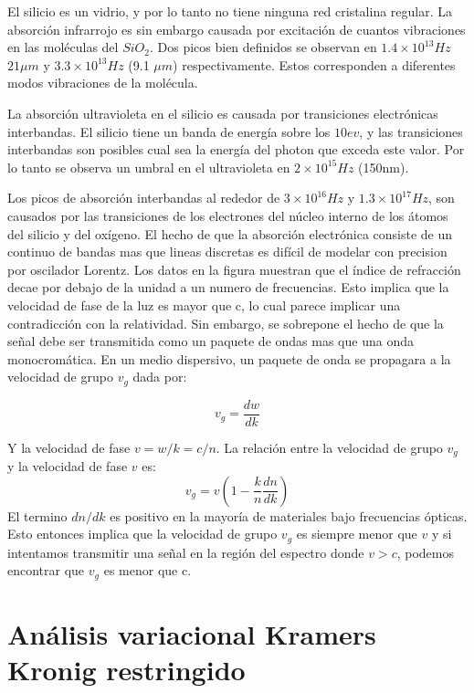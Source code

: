 \documentclass[a4paper,openright,12pt]{book}
\begin{document}
El silicio es un vidrio, y por lo tanto no tiene ninguna red cristalina regular. La absorción infrarrojo es sin embargo causada por excitación de cuantos vibraciones en las moléculas del $SiO_{2}$. Dos picos bien definidos se observan en $1.4\times 10^{13}Hz$ $21\mu m$ y $3.3\times 10^{13}Hz$ (9.1 $\mu m$) respectivamente. Estos corresponden a diferentes modos vibraciones de la molécula. 

La absorción ultravioleta en el silicio es causada por transiciones electrónicas interbandas. El silicio tiene un banda de energía sobre los $10ev$, y las transiciones interbandas son posibles cual sea la energía del photon que exceda este valor. Por lo tanto se observa un umbral en el ultravioleta en $2\times 10^{15}Hz$ (150nm).

Los picos de absorción interbandas al rededor de $ 3 \times  10^{16}Hz$ y $1.3 \times 10^{17} Hz$, son causados por las transiciones de los electrones del núcleo interno de los átomos del silicio y del oxígeno. El hecho de que la absorción electrónica consiste de un continuo de bandas mas que lineas discretas es difícil de modelar con precision por oscilador Lorentz. 
Los datos en la figura\cite{experimento} muestran que el índice de refracción decae por debajo de la unidad a un numero de frecuencias. Esto implica que la velocidad de fase de la luz es mayor que c, lo cual parece implicar una contradicción con la relatividad. Sin embargo, se sobrepone el hecho de que la señal debe ser transmitida como un paquete de ondas mas que una onda monocromática. En un medio dispersivo, un paquete de onda se propagara a la velocidad de grupo $v_{g}$ dada por:

\begin{equation}
v_{g}=\frac{dw}{dk}
\end{equation}

Y la velocidad de fase $v=w/k=c/n$. La relación entre la velocidad de grupo $v_{g}$ y la velocidad de fase $v$ es:
\begin{equation}
v_{g}=v(1-\frac{k}{n}\frac{dn}{dk})
\end{equation}
El termino $dn/dk$ es positivo en la mayoría de materiales bajo frecuencias ópticas. Esto entonces implica que la velocidad de grupo $v_{g}$ es siempre menor que $v$ y si intentamos transmitir una señal en la región del espectro donde $v>c$, podemos encontrar que $v_{g}$ es menor que c. 


\section{Análisis variacional Kramers Kronig restringido}
\end{document}

